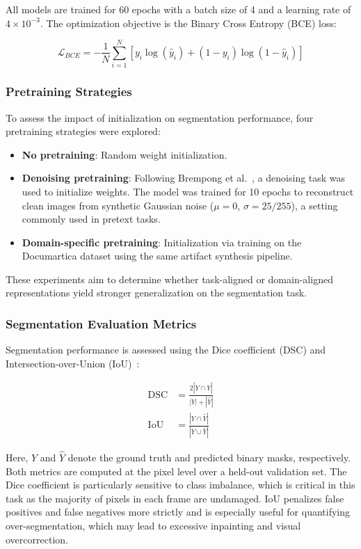 \documentclass[10pt,a4paper,twocolumn,twoside]{article}
\begin{document}
All models are trained for 60 epochs with a batch size of 4 and a learning rate of $4 \times 10^{-3}$. The optimization objective is the Binary Cross Entropy (BCE) loss:

\begin{equation*}
\mathcal{L}_{BCE} = -\frac{1}{N} \sum_{i=1}^{N} \left[ y_i \log(\hat{y}_i) + (1 - y_i) \log(1 - \hat{y}_i) \right]
\end{equation*}

\subsubsection{Pretraining Strategies}

To assess the impact of initialization on segmentation performance, four pretraining strategies were explored:

\begin{itemize}
    \item \textbf{No pretraining}: Random weight initialization.
    \item \textbf{Denoising pretraining}: Following Brempong et al.~\cite{denoise}, a denoising task was used to initialize weights. The model was trained for 10 epochs to reconstruct clean images from synthetic Gaussian noise ($\mu=0$, $\sigma=25/255$), a setting commonly used in pretext tasks.
    \item \textbf{Domain-specific pretraining}: Initialization via training on the Documartica dataset using the same artifact synthesis pipeline.
\end{itemize}

These experiments aim to determine whether task-aligned or domain-aligned representations yield stronger generalization on the segmentation task.

\subsubsection{Segmentation Evaluation Metrics}

Segmentation performance is assessed using the Dice coefficient (DSC) and Intersection-over-Union (IoU)~\cite{segmetrics}:

\begin{align*}
    \text{DSC} &= \frac{2 |Y \cap \hat{Y}|}{|Y| + |\hat{Y}|} \\
    \text{IoU} &= \frac{|Y \cap \hat{Y}|}{|Y \cup \hat{Y}|}
\end{align*}

Here, $Y$ and $\hat{Y}$ denote the ground truth and predicted binary masks, respectively. Both metrics are computed at the pixel level over a held-out validation set. The Dice coefficient is particularly sensitive to class imbalance, which is critical in this task as the majority of pixels in each frame are undamaged. IoU penalizes false positives and false negatives more strictly and is especially useful for quantifying over-segmentation, which may lead to excessive inpainting and visual overcorrection.
\end{document}
